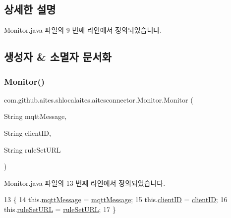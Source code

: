 \subsection{상세한 설명}


Monitor.\+java 파일의 9 번째 라인에서 정의되었습니다.



\subsection{생성자 \& 소멸자 문서화}
\mbox{\label{classcom_1_1github_1_1aites_1_1shlocalaites_1_1aitesconnector_1_1_monitor_a8a2fe3628e8d440249635e65e57cd780}} 
\subsubsection{\texorpdfstring{Monitor()}{Monitor()}}
{\footnotesize\ttfamily com.\+github.\+aites.\+shlocalaites.\+aitesconnector.\+Monitor.\+Monitor (\begin{DoxyParamCaption}\item[{String}]{mqtt\+Message,  }\item[{String}]{client\+ID,  }\item[{String}]{rule\+Set\+U\+RL }\end{DoxyParamCaption})}



Monitor.\+java 파일의 13 번째 라인에서 정의되었습니다.


\begin{DoxyCode}
13                                                                           \{
14         this.\mbox{\hyperlink{classcom_1_1github_1_1aites_1_1shlocalaites_1_1aitesconnector_1_1_monitor_aa114674db8bbf02bddfd924c47b0f37d}{mqttMessage}} = \mbox{\hyperlink{classcom_1_1github_1_1aites_1_1shlocalaites_1_1aitesconnector_1_1_monitor_aa114674db8bbf02bddfd924c47b0f37d}{mqttMessage}};
15         this.\mbox{\hyperlink{classcom_1_1github_1_1aites_1_1shlocalaites_1_1aitesconnector_1_1_monitor_af90245733de0b510a4d35b1d6e157f78}{clientID}} = \mbox{\hyperlink{classcom_1_1github_1_1aites_1_1shlocalaites_1_1aitesconnector_1_1_monitor_af90245733de0b510a4d35b1d6e157f78}{clientID}};
16         this.\mbox{\hyperlink{classcom_1_1github_1_1aites_1_1shlocalaites_1_1aitesconnector_1_1_monitor_a67ed331ce2b0c4b32190feb1b71ab6e4}{ruleSetURL}} = \mbox{\hyperlink{classcom_1_1github_1_1aites_1_1shlocalaites_1_1aitesconnector_1_1_monitor_a67ed331ce2b0c4b32190feb1b71ab6e4}{ruleSetURL}};
17     \}
\end{DoxyCode}


